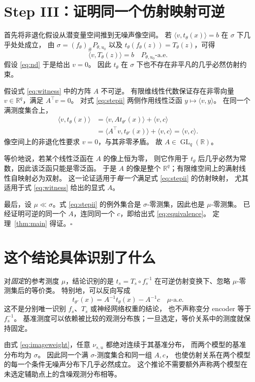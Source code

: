 \documentclass[UTF8,fontset=fandol,11pt,a4paper]{ctexart}
\theoremstyle{definition}
\newcommand{\R}{\mathbb R}
\newcommand{\aev}{\text{-a.e.}}
\newcommand{\push}{_{\#}}
\newcommand{\GL}{\operatorname{GL}}
\newcommand{\ip}[2]{\langle #1,#2\rangle}
\begin{document}
\section{Step III：证明同一个仿射映射可逆}

首先将非退化假设从潜变量空间推到无噪声像空间。
若 $\ip{v}{t_\theta(x)}=b$ 在 $\sigma$ 下几乎处处成立，
由 $\sigma=(f_\theta)\push P_{\theta,u_0}$ 以及
$t_\theta(f_\theta(z))=T_\theta(z)$，可得
\[
 \ip{v}{T_\theta(z)}=b\quad P_{\theta,u_0}\aev
\]
假设 \eqref{eq:nd} 于是给出 $v=0$。
因此 $t_\theta$ 在 $\sigma$ 下也不存在非平凡的几乎必然仿射约束。

假设式 \eqref{eq:witness} 中的方阵 $A$ 不可逆。
有限维线性代数保证存在非零向量 $v\in\R^q$，满足 $A^\top v=0$。
对式 \eqref{eq:stepii} 两侧作用线性泛函 $y\mapsto\ip{v}{y}$。
在同一个满测度集合上，
\begin{align*}
 \ip{v}{t_\theta(x)}
 &=\ip{v}{A t_{\theta'}(x)}+\ip{v}{c}\\
 &=\ip{A^\top v}{t_{\theta'}(x)}+\ip{v}{c}
 =\ip{v}{c}.
\end{align*}
像空间上的非退化性要求 $v=0$，与其非零矛盾。
故 $A\in\GL_q(\R)$。

等价地说，若某个线性泛函在 $A$ 的像上恒为零，
则它作用于 $t_\theta$ 后几乎必然为常数，因此该泛函只能是零泛函。
于是 $A$ 的像是整个 $\R^q$；有限维空间上的满射线性自映射必为双射。
这一论证适用于\emph{每一个}满足式 \eqref{eq:stepii} 的仿射映射，
尤其适用于式 \eqref{eq:witness} 给出的显式 $A$。

最后，设 $\mu\ll\sigma$。式 \eqref{eq:stepii} 的例外集合是
$\sigma$-零测集，因此也是 $\mu$-零测集。
已经证明可逆的同一个 $A$，连同同一个 $c$，即给出式 \eqref{eq:equivalence}。
定理~\ref{thm:main} 得证。\hfill$\square$

\section{这个结论具体识别了什么}

对\emph{固定}的参考测度 $\mu$，结论识别的是
$t_s=T_s\circ f_s^{-1}$ 在可逆仿射变换下、忽略 $\mu$-零测集后的等价类。
特别地，可以反向写成
\[
 t_{\theta'}(x)=A^{-1}t_\theta(x)-A^{-1}c\quad\mu\aev
\]
这不是分别唯一识别 $f_s$、$T_s$ 或神经网络权重的结论，
也不声称变分 encoder 等于 $f_s^{-1}$。
基准测度可以依赖被比较的观测分布族；一旦选定，等价关系中的测度就保持固定。

由式 \eqref{eq:imageweight}，任意 $\nu_{s,u}$ 都绝对连续于其基准分布，
而两个模型的基准分布均为 $\sigma$。
因此同一个满 $\sigma$-测度集合和同一组 $A,c$，
也使仿射关系在两个模型的每一个条件无噪声分布下几乎必然成立。
这个推论不需要额外声称两个模型在未选定辅助点上的含噪观测分布相等。
\end{document}
